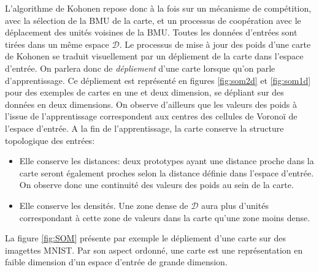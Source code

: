 \documentclass[../main]{subfiles}
\begin{document}
L'algorithme de Kohonen repose donc à la fois sur un mécanisme de compétition, avec la sélection de la BMU de la carte, et un processus de coopération avec le déplacement des unités voisines de la BMU.
Toutes les données d'entrées sont tirées dans un même espace $\mathcal{D}$.
Le processus de mise à jour des poids d'une carte de Kohonen se traduit visuellement par un dépliement de la carte dans l'espace d'entrée. On parlera donc de \emph{dépliement} d'une carte lorsque qu'on parle d'apprentissage. Ce dépliement est représenté en figures \ref{fig:som2d} et \ref{fig:som1d} pour des exemples de cartes en une et deux dimension, se dépliant sur des données en deux dimensions. On observe d'ailleurs que les valeurs des poids à l'issue de l'apprentissage correspondent aux centres des cellules de Voronoï de l'espace d'entrée.
A la fin de l'apprentissage, la carte conserve la structure topologique des entrées:
\begin{itemize}
\item Elle conserve les distances: deux prototypes ayant une distance proche dans la carte seront également proches selon la distance définie dans l'espace d'entrée. On observe donc une continuité des valeurs des poids au sein de la carte.
\item Elle conserve les densités. Une zone dense de $\mathcal{D}$ aura plus d'unités correspondant à cette zone de valeurs dans la carte qu'une zone moins dense.
\end{itemize}
La figure \ref{fig:SOM} présente par exemple le dépliement d'une carte sur des imagettes MNIST.
Par son aspect ordonné, une carte est une représentation en faible dimension d'un espace d'entrée de grande dimension. 


\end{document}
